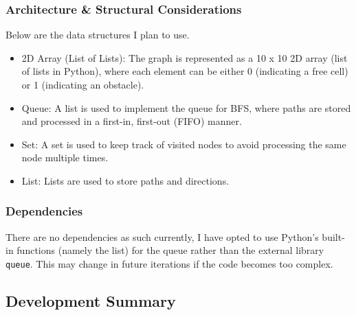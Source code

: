 \subsubsection{Architecture \& Structural Considerations}

Below are the data structures I plan to use.
\begin{itemize}
    \item 2D Array (List of Lists): The graph is represented as a 10 x 10 2D array (list of lists in Python), where each element can be either 0 (indicating a free cell) or 1 (indicating an obstacle).
    \item Queue: A list is used to implement the queue for BFS, where paths are stored and processed in a first-in, first-out (FIFO) manner.
    \item Set: A set is used to keep track of visited nodes to avoid processing the same node multiple times.
    \item List: Lists are used to store paths and directions.

\end{itemize}

\subsubsection{Dependencies}
There are no dependencies as such currently, I have opted to use Python's built-in functions (namely the list) for the queue rather than the external library \verb|queue|. This may change in future iterations if the code becomes too complex.

\subsection{Development Summary}

